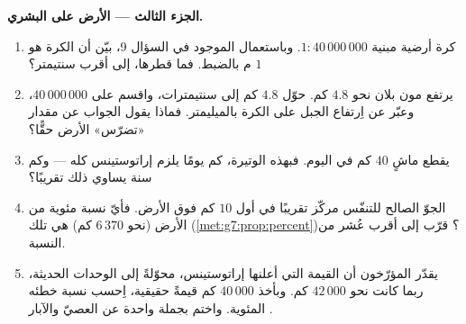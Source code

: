 \begin{problem}
\medskip
\noindent\textbf{الجزء الثالث --- الأرض على  البشري.}
\begin{enumerate}[resume]
  \item كرة أرضية مبنية  $1 : 40\,000\,000$. وباستعمال
         الموجود في السؤال 9، بيّن أن
         الكرة هو $1$ م بالضبط. فما
        قطرها، إلى أقرب سنتيمتر؟
  \item يرتفع مون بلان نحو $4.8$ كم. حوّل $4.8$ كم إلى
        سنتيمترات، واقسم على $40\,000\,000$، وعبّر عن
        اِرتفاع الجبل على الكرة بالميليمتر. فماذا يقول
        الجواب عن مقدار «تضرّس» الأرض حقًّا؟
  \item يقطع ماشٍ $40$ كم في اليوم. فبهذه الوتيرة، كم
        يومًا يلزم  إراتوستينس كله --- وكم
        سنة يساوي ذلك تقريبًا؟
  \item الجوّ الصالح للتنفّس مركّز تقريبًا في
        أول $10$ كم فوق الأرض. فأيّ نسبة مئوية من
         الأرض (نحو $6\,370$ كم) هي تلك
        (\cref{met:g7:prop:percent})؟ قرّب إلى أقرب
        عُشر من النسبة.
  \item يقدّر المؤرّخون أن القيمة التي أعلنها إراتوستينس،
        محوّلةً إلى الوحدات الحديثة، ربما كانت نحو
        $42\,000$ كم. وبأخذ $40\,000$ كم قيمةً حقيقية،
        اِحسب نسبة خطئه المئوية. واختم بجملة
        واحدة عن العصيّ والآبار .
\end{enumerate}
\end{problem}
